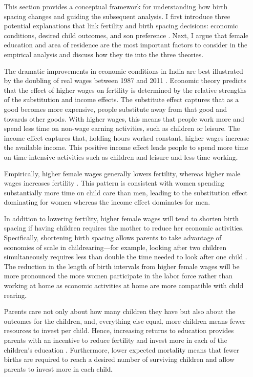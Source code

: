 This section provides a conceptual framework for understanding how birth spacing changes
and guiding the subsequent analysis.
I first introduce three potential explanations that link fertility and birth 
spacing decisions: economic conditions, desired child outcomes, and son preference 
\citep{Casterline2016,Portner2018}.
Next, I argue that female education and area of residence are the most important factors 
to consider in the empirical analysis and discuss how they tie into the three theories.

The dramatic improvements in economic conditions in India are best illustrated by the 
doubling of real wages between 1987 and 2011 \citep{Klasen2015}.
Economic theory predicts that the effect of higher wages on fertility is determined by 
the relative strengths of the substitution and income effects.
The substitute effect captures that as a good becomes more expensive, people substitute 
away from that good and towards other goods.
With higher wages, this means that people work more and spend less time on non-wage 
earning activities, such as children or leisure.
The income effect captures that, holding hours worked constant, higher wages increase the 
available income. 
This positive income effect leads people to spend more time on time-intensive activities 
such as children and leisure and less time working.

Empirically, higher female wages generally lowers fertility, whereas higher male 
wages increases fertility \citet{Hotz1997,schultz97}.
This pattern is consistent with women spending substantially more time on child care 
than men, leading to the substitution effect dominating for women whereas the income
effect dominates for men.

In addition to lowering fertility, higher female wages will tend to shorten birth spacing 
if having children requires the mother to reduce her economic activities.
Specifically, shortening birth spacing allows parents to take advantage of economies of 
scale in childrearing---for example, looking after two children simultaneously requires 
less than double the time needed to look after one child \citep{Vijverberg1982,Hotz1997}.
The reduction in the length of birth intervals from higher female wages will be more 
pronounced the more women participate in the labor force rather than working at home as 
economic activities at home are more compatible with child rearing.


Parents care not only about how many children they have but also about the outcomes
for the children, and, everything else equal, more children means fewer resources to 
invest per child.
Hence, increasing returns to education provides parents with an incentive to reduce 
fertility and invest more in each of the children's education \citep{Rosenzweig1982a}.
Furthermore, lower expected mortality means that fewer births are required to reach a 
desired number of surviving children and allow parents to invest more in each child.

